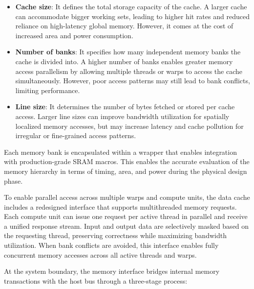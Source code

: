             \vspace{-1em}
            \begin{itemize}
                \item \textbf{Cache size}: It defines the total storage capacity of the cache. A larger cache can accommodate bigger working sets, leading to higher hit rates and reduced reliance on high-latency global memory. However, it comes at the cost of increased area and power consumption.
            
                \item \textbf{Number of banks}: It specifies how many independent memory banks the cache is divided into. A higher number of banks enables greater memory access parallelism by allowing multiple threads or warps to access the cache simultaneously. However, poor access patterns may still lead to bank conflicts, limiting performance.
            
                \item \textbf{Line size}: It determines the number of bytes fetched or stored per cache access. Larger line sizes can improve bandwidth utilization for spatially localized memory accesses, but may increase latency and cache pollution for irregular or fine-grained access patterns.
            \end{itemize}
            \vspace{-1em}
            
            Each memory bank is encapsulated within a wrapper that enables integration with production-grade SRAM macros. This enables the accurate evaluation of the memory hierarchy in terms of timing, area, and power during the physical design phase.
            
            To enable parallel access across multiple warps and compute units, the data cache includes a redesigned interface that supports multithreaded memory requests. Each compute unit can issue one request per active thread in parallel and receive a unified response stream. Input and output data are selectively masked based on the requesting thread, preserving correctness while maximizing bandwidth utilization. When bank conflicts are avoided, this interface enables fully concurrent memory accesses across all active threads and warps.
            
            At the system boundary, the memory interface bridges internal memory transactions with the host bus through a three-stage process:

